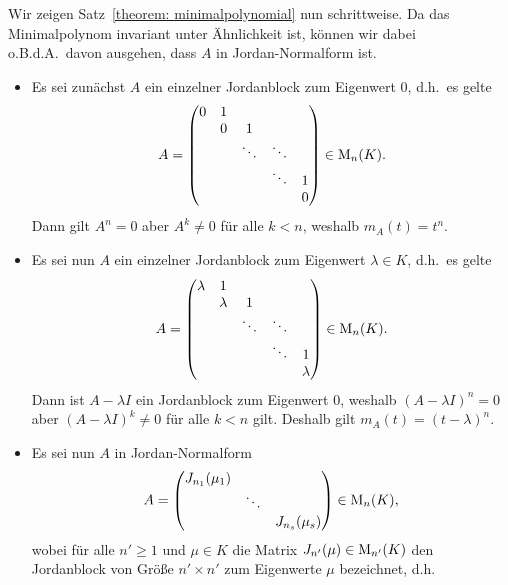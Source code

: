 \documentclass[a4paper,10pt]{scrartcl}
\begin{document}
Wir zeigen Satz~\ref{theorem: minimalpolynomial} nun schrittweise.
Da das Minimalpolynom invariant unter Ähnlichkeit ist, können wir dabei o.B.d.A.\ davon ausgehen, dass $A$ in Jordan-Normalform ist.
\begin{itemize}
  \item
    Es sei zunächst $A$ ein einzelner Jordanblock zum Eigenwert $0$, d.h.\ es gelte
    \[
        A
      = \begin{pmatrix}
          0 & 1 &         &         &   \\
            & 0 & 1       &         &   \\
            &   & \ddots  & \ddots  &   \\
            &   &         & \ddots  & 1 \\
            &   &         &         & 0
        \end{pmatrix}
      \in \operatorname{M}_{n}(K).
    \]
    Dann gilt $A^n = 0$ aber $A^k \neq 0$ für alle $k < n$, weshalb $m_A(t) = t^n$.
  \item
    Es sei nun $A$ ein einzelner Jordanblock zum Eigenwert $\lambda \in K$, d.h.\ es gelte
    \[
        A
      = \begin{pmatrix}
          \lambda & 1       &         &         &         \\
                  & \lambda & 1       &         &         \\
                  &         & \ddots  & \ddots  &         \\
                  &         &         & \ddots  & 1       \\
                  &         &         &         & \lambda
        \end{pmatrix}
      \in \operatorname{M}_{n}(K).
    \]
    Dann ist $A - \lambda I$ ein Jordanblock zum Eigenwert $0$, weshalb $(A - \lambda I)^n = 0$ aber $(A - \lambda I)^k \neq 0$ für alle $k < n$ gilt.
    Deshalb gilt $m_A(t) = (t - \lambda)^n$.
  \item
    Es sei nun $A$ in Jordan-Normalform
    \[
        A
      = \begin{pmatrix}
          J_{n_1}(\mu_1)  &         &                 \\
                          & \ddots  &                 \\
                          &         & J_{n_s}(\mu_s)
        \end{pmatrix}
      \in \operatorname{M}_{n}(K),
    \]
    wobei für alle $n' \geq 1$ und $\mu \in K$ die Matrix $J_{n'}(\mu) \in \operatorname{M}_{n'}(K)$ den Jordanblock von Größe $n' \times n'$ zum Eigenwerte $\mu$ bezeichnet, d.h.\

\end{itemize}
\end{document}
